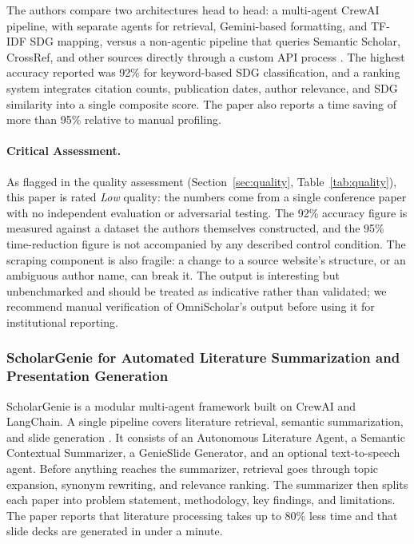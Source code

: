 \documentclass[sn-basic,Numbered]{sn-jnl}
\begin{document}
The authors compare two architectures head to head: a multi-agent
CrewAI pipeline, with separate agents for retrieval, Gemini-based
formatting, and TF-IDF SDG mapping, versus a non-agentic pipeline that
queries Semantic Scholar, CrossRef, and other sources directly through
a custom API process \cite{kunekar2025omnischolar}. The highest
accuracy reported was 92\% for keyword-based SDG classification, and a
ranking system integrates citation counts, publication dates, author
relevance, and SDG similarity into a single composite score. The paper
also reports a time saving of more than 95\% relative to manual
profiling.

\paragraph{Critical Assessment.} As flagged in the quality assessment
(Section~\ref{sec:quality}, Table~\ref{tab:quality}), this paper is
rated \emph{Low} quality: the numbers come from a single conference
paper with no independent evaluation or adversarial testing. The 92\%
accuracy figure is measured against a dataset the authors themselves
constructed, and the 95\% time-reduction figure is not accompanied by
any described control condition. The scraping component is also
fragile: a change to a source website's structure, or an ambiguous
author name, can break it. The output is interesting but unbenchmarked
and should be treated as indicative rather than validated; we
recommend manual verification of OmniScholar's output before using it
for institutional reporting.

\subsubsection{ScholarGenie for Automated Literature Summarization and Presentation Generation}

ScholarGenie is a modular multi-agent framework built on CrewAI and
LangChain. A single pipeline covers literature retrieval, semantic
summarization, and slide generation \cite{shanmuganan2025scholargenie}.
It consists of an Autonomous Literature Agent, a Semantic Contextual
Summarizer, a GenieSlide Generator, and an optional text-to-speech
agent. Before anything reaches the summarizer, retrieval goes through
topic expansion, synonym rewriting, and relevance ranking. The
summarizer then splits each paper into problem statement, methodology,
key findings, and limitations. The paper reports that literature
processing takes up to 80\% less time and that slide decks are
generated in under a minute.
\end{document}
